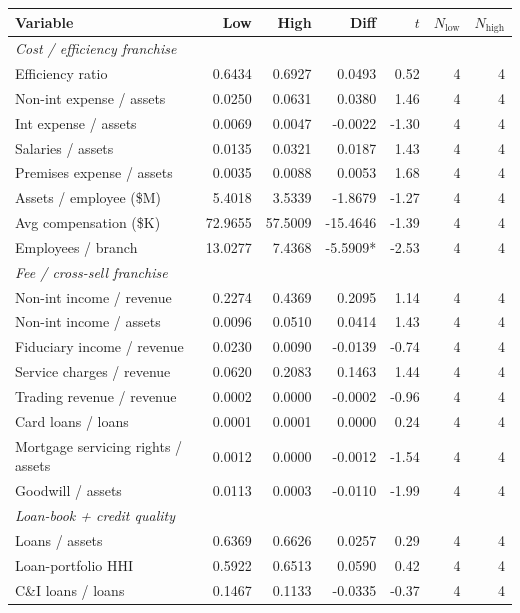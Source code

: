 \begin{tabular}{lrrrrrr}
\toprule
Variable & Low & High & Diff & $t$ & $N_{\text{low}}$ & $N_{\text{high}}$ \\
\midrule
\multicolumn{7}{l}{\emph{Cost / efficiency franchise}} \\
\midrule
Efficiency ratio & 0.6434 & 0.6927 & 0.0493 & 0.52 & 4 & 4 \\
Non-int expense / assets & 0.0250 & 0.0631 & 0.0380 & 1.46 & 4 & 4 \\
Int expense / assets & 0.0069 & 0.0047 & -0.0022 & -1.30 & 4 & 4 \\
Salaries / assets & 0.0135 & 0.0321 & 0.0187 & 1.43 & 4 & 4 \\
Premises expense / assets & 0.0035 & 0.0088 & 0.0053 & 1.68 & 4 & 4 \\
Assets / employee (\$M) & 5.4018 & 3.5339 & -1.8679 & -1.27 & 4 & 4 \\
Avg compensation (\$K) & 72.9655 & 57.5009 & -15.4646 & -1.39 & 4 & 4 \\
Employees / branch & 13.0277 & 7.4368 & -5.5909* & -2.53 & 4 & 4 \\
\midrule
\multicolumn{7}{l}{\emph{Fee / cross-sell franchise}} \\
\midrule
Non-int income / revenue & 0.2274 & 0.4369 & 0.2095 & 1.14 & 4 & 4 \\
Non-int income / assets & 0.0096 & 0.0510 & 0.0414 & 1.43 & 4 & 4 \\
Fiduciary income / revenue & 0.0230 & 0.0090 & -0.0139 & -0.74 & 4 & 4 \\
Service charges / revenue & 0.0620 & 0.2083 & 0.1463 & 1.44 & 4 & 4 \\
Trading revenue / revenue & 0.0002 & 0.0000 & -0.0002 & -0.96 & 4 & 4 \\
Card loans / loans & 0.0001 & 0.0001 & 0.0000 & 0.24 & 4 & 4 \\
Mortgage servicing rights / assets & 0.0012 & 0.0000 & -0.0012 & -1.54 & 4 & 4 \\
Goodwill / assets & 0.0113 & 0.0003 & -0.0110 & -1.99 & 4 & 4 \\
\midrule
\multicolumn{7}{l}{\emph{Loan-book + credit quality}} \\
\midrule
Loans / assets & 0.6369 & 0.6626 & 0.0257 & 0.29 & 4 & 4 \\
Loan-portfolio HHI & 0.5922 & 0.6513 & 0.0590 & 0.42 & 4 & 4 \\
C\&I loans / loans & 0.1467 & 0.1133 & -0.0335 & -0.37 & 4 & 4 \\

\end{tabular}
